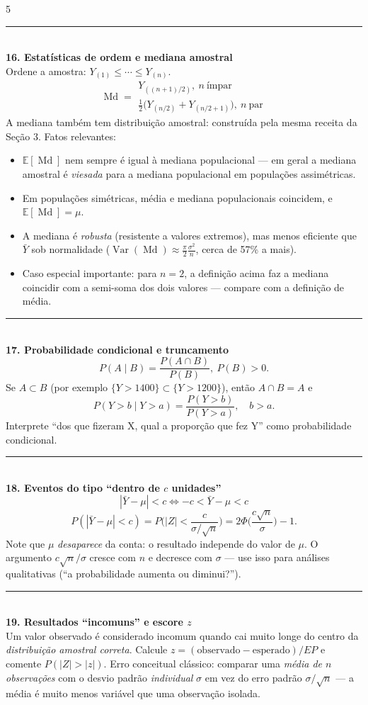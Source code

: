 \documentclass[a4paper,8pt]{extarticle}
\newcommand{\tit}[1]{\vspace{2pt}\textcolor{azul}{\rule{\linewidth}{0.6pt}}\\[1pt]\textbf{\textcolor{azul}{#1}}\\[1pt]}
\newcommand{\E}{\mathbb{E}}
\newcommand{\Var}{\operatorname{Var}}
\newcommand{\Med}{\operatorname{Md}}
\begin{document}
\begin{multicols*}{5}
\tit{16. Estatísticas de ordem e mediana amostral}
Ordene a amostra: $Y_{(1)}\le\cdots\le Y_{(n)}$.
\[\Med=\begin{array}{l}Y_{((n+1)/2)},\ n\ \text{ímpar}\\[2pt] \tfrac{1}{2}\big(Y_{(n/2)}+Y_{(n/2+1)}\big),\ n\ \text{par}\end{array}\]
A mediana também tem distribuição amostral: construída pela mesma receita da Seção 3. Fatos relevantes:
\begin{itemize}
\item $\E[\Med]$ nem sempre é igual à mediana populacional — em geral a mediana amostral é \emph{viesada} para a mediana populacional em populações assimétricas.
\item Em populações simétricas, média e mediana populacionais coincidem, e $\E[\Med]=\mu$.
\item A mediana é \emph{robusta} (resistente a valores extremos), mas menos eficiente que $\bar Y$ sob normalidade ($\Var(\Med)\approx \frac{\pi}{2}\frac{\sigma^2}{n}$, cerca de 57\% a mais).
\item Caso especial importante: para $n=2$, a definição acima faz a mediana coincidir com a semi-soma dos dois valores — compare com a definição de média.
\end{itemize}

\tit{17. Probabilidade condicional e truncamento}
\[P(A\mid B)=\frac{P(A\cap B)}{P(B)},\ P(B)>0 .\]
Se $A\subset B$ (por exemplo $\{Y>1400\}\subset\{Y>1200\}$), então $A\cap B=A$ e
\[P(Y>b\mid Y>a)=\frac{P(Y>b)}{P(Y>a)},\quad b>a .\]
Interprete “dos que fizeram X, qual a proporção que fez Y” como probabilidade condicional.

\tit{18. Eventos do tipo “dentro de $c$ unidades”}
\[|\bar Y-\mu|<c \iff -c<\bar Y-\mu<c\]
\[P(|\bar Y-\mu|<c)=P\!\Big(|Z|<\frac{c}{\sigma/\sqrt n}\Big)=2\Phi\!\Big(\frac{c\sqrt n}{\sigma}\Big)-1 .\]
Note que $\mu$ \emph{desaparece} da conta: o resultado independe do valor de $\mu$. O argumento $c\sqrt n/\sigma$ cresce com $n$ e decresce com $\sigma$ — use isso para análises qualitativas (“a probabilidade aumenta ou diminui?”).

\tit{19. Resultados “incomuns” e escore $z$}
Um valor observado é considerado incomum quando cai muito longe do centro da \emph{distribuição amostral correta}. Calcule $z=(\text{observado}-\text{esperado})/EP$ e comente $P(|Z|>|z|)$. Erro conceitual clássico: comparar uma \emph{média de $n$ observações} com o desvio padrão \emph{individual} $\sigma$ em vez do erro padrão $\sigma/\sqrt n$ — a média é muito menos variável que uma observação isolada.


\end{multicols*}
\end{document}
